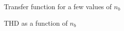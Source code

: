 \begin{figure}[htbp]
	\centering
	\caption{Transfer function for a few values of $n_b$}
	\label{fig:tfcomparison}
\end{figure}
\begin{figure}[htbp]
	\centering
	\caption{THD as a function of $n_b$}
	\label{fig:thdplot}
\end{figure}
